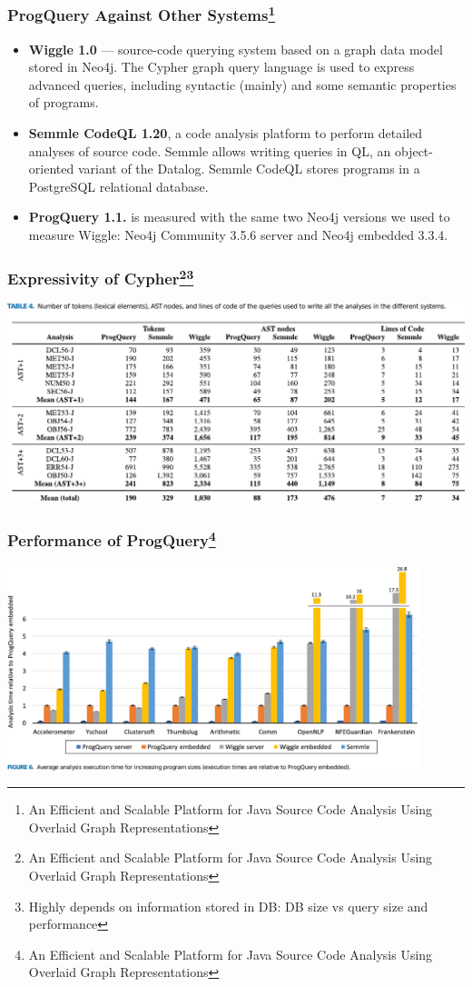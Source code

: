 \documentclass[xcolor=table,aspectratio=169]{beamer}
\begin{document}
\begin{frame}[fragile]
  \frametitle{ProgQuery Against Other Systems\footnote{An Efficient and Scalable Platform for Java Source Code Analysis Using Overlaid Graph Representations}}
  \begin{itemize}
    \item \textbf{Wiggle 1.0} --- source-code querying system based on a graph data model stored in Neo4j.
    The Cypher graph query language is used to express advanced queries, including syntactic (mainly) and some
    semantic properties of programs.
    \item \textbf{Semmle CodeQL 1.20}, a code analysis platform to perform detailed analyses of source code. Semmle
    allows writing queries in QL, an object-oriented variant of the Datalog. Semmle CodeQL stores programs in a PostgreSQL relational
    database.
    \item \textbf{ProgQuery 1.1.} is measured with the same two Neo4j versions we used to measure Wiggle: Neo4j Community 3.5.6 server and Neo4j embedded 3.3.4.    
  \end{itemize}
\end{frame}

\begin{frame}[fragile]
  \frametitle{Expressivity of Cypher\footnote{An Efficient and Scalable Platform for Java Source Code Analysis Using Overlaid Graph Representations}\footnote{Highly depends on information stored in DB: DB size vs query size and performance}}
  \includegraphics[width=\textwidth]{pictures/ExpressivityOfCypher}
\end{frame}

\begin{frame}[fragile]
  \frametitle{Performance of ProgQuery\footnote{An Efficient and Scalable Platform for Java Source Code Analysis Using Overlaid Graph Representations}}
  \begin{center}
    \includegraphics[width=0.9\textwidth]{pictures/Performance}
  \end{center}
\end{frame}
\end{document}
